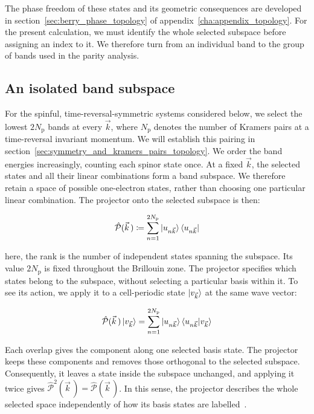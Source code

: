 The phase freedom of these states and its geometric consequences are developed in section~\ref{sec:berry_phase_topology} of appendix~\ref{cha:appendix_topology}.
For the present calculation, we must identify the whole selected subspace before assigning an index to it.
We therefore turn from an individual band to the group of bands used in the parity analysis.

\FloatBarrier
\subsection{An isolated band subspace}
\label{subsec:isolated_band_subspace_topology}

For the spinful, time-reversal-symmetric systems considered below,
we select the lowest $2N_\mathrm{p}$ bands at every $\vec{k}$,
where $N_\mathrm{p}$ denotes the number of Kramers pairs at a time-reversal invariant momentum.
We will establish this pairing in section~\ref{sec:symmetry_and_kramers_pairs_topology}.
We order the band energies increasingly, counting each spinor state once.
At a fixed $\vec{k}$, the selected states and all their linear combinations form a band subspace.
We therefore retain a space of possible one-electron states, rather than choosing one particular linear combination.
The projector onto the selected subspace is then:

\begin{equation}
    \hat{\mathcal{P}}(\vec{k}\,)
    \coloneqq\sum_{n=1}^{2N_\mathrm{p}}
    \ket{u_{n\vec{k}}}\bra{u_{n\vec{k}}}
\label{band_subspace_projector_topology}
\end{equation}

here, the rank is the number of independent states spanning the subspace.
Its value $2N_\mathrm{p}$ is fixed throughout the Brillouin zone.
The projector specifies which states belong to the subspace,
without selecting a particular basis within it.
To see its action, we apply it to a cell-periodic state $\ket{v_{\vec{k}}}$ at the same wave vector:

\begin{equation}
    \hat{\mathcal{P}}(\vec{k}\,)\ket{v_{\vec{k}}}
    =\sum_{n=1}^{2N_\mathrm{p}}
    \ket{u_{n\vec{k}}}\braket{u_{n\vec{k}}|v_{\vec{k}}}
\label{band_projector_action_topology}
\end{equation}

Each overlap gives the component along one selected basis state.
The projector keeps these components and removes those orthogonal to the selected subspace.
Consequently, it leaves a state inside the subspace unchanged, and applying it twice gives
$\hat{\mathcal{P}}^2(\vec{k}\,)=\hat{\mathcal{P}}(\vec{k}\,)$.
In this sense, the projector describes the whole selected space independently of how its basis states are labelled~\cite{marzari2012maximally}.

